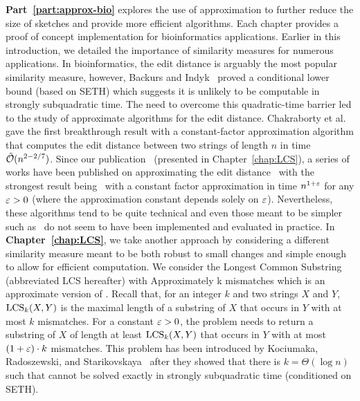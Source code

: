 \textbf{Part~\ref{part:approx-bio}} explores the use of approximation to further reduce the size of sketches and provide more efficient algorithms. Each chapter provides a proof of concept implementation for bioinformatics applications.
%
Earlier in this introduction, we detailed the importance of similarity measures for numerous applications.
In bioinformatics, the edit distance is arguably the most popular similarity measure, however, Backurs and Indyk~\cite{DBLP:conf/stoc/BackursI15} proved a conditional lower bound (based on SETH) which suggests it is unlikely to be computable in strongly subquadratic time.
The need to overcome this quadratic-time barrier led to the study of approximate algorithms for the edit distance. Chakraborty et al.~\cite{DBLP:conf/focs/ChakrabortyDGKS18} gave the first breakthrough result with a constant-factor approximation algorithm that computes the edit distance between two strings of length $n$ in time $\tilde{\mathcal{O}}(n^{2-2/7})$.
Since our publication~\cite{DBLP:conf/cpm/GourdelKRS20} (presented in Chapter~\ref{chap:LCS}), a series of works have been published on approximating the edit distance~\cite{brakensiek2020constant,koucky2020constant} with the strongest result being~\cite{andoni2020edit} with a constant factor approximation in time $n^{1+\varepsilon}$ for any $\varepsilon>0$ (where the approximation constant depends solely on $\varepsilon$).
Nevertheless, these algorithms tend to be quite technical and even those meant to be simpler such as~\cite{andoni2020simple} do not seem to have been implemented and evaluated in practice.
In \textbf{Chapter~\ref{chap:LCS}}, we take another approach by considering a different similarity measure meant to be both robust to small changes and simple enough to allow for efficient computation. We consider the Longest Common Substring (abbreviated LCS hereafter) with Approximately k mismatches which is an approximate version of \kLCS. Recall that, for an integer $k$ and two strings $X$ and $Y$, $\mathrm{LCS}_{k}(X,Y)$ is the maximal length of a substring of $X$ that occurs in $Y$ with at most $k$ mismatches.
For a constant $\varepsilon > 0$, the \kApproxLCS problem needs to return a substring of $X$ of length at least $\mathrm{LCS}_{k}(X,Y)$ that occurs in $Y$ with at most $(1+\varepsilon) \cdot k$ mismatches. This problem has been introduced by Kociumaka, Radoszewski, and Starikovskaya~\cite{DBLP:journals/algorithmica/KociumakaRS19} after they showed that there is $k=\Theta(\log n)$ such that \kLCS cannot be solved exactly in strongly subquadratic time (conditioned on SETH).
